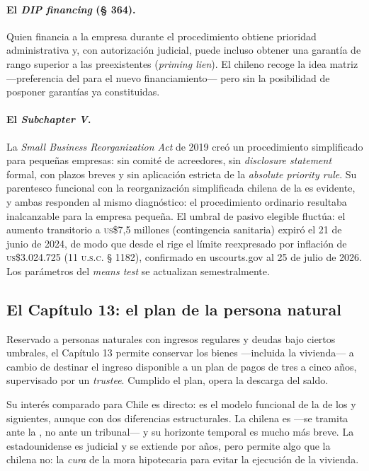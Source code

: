 \paragraph{El \emph{DIP financing} (§ 364).} Quien financia a la empresa durante el procedimiento
obtiene prioridad administrativa y, con autorización judicial, puede incluso obtener una garantía
de rango superior a las preexistentes (\emph{priming lien}). El  chileno recoge la idea
matriz ---preferencia del   para el nuevo financiamiento--- pero sin la
posibilidad de posponer garantías ya constituidas.

\paragraph{El \emph{Subchapter V}.} La \emph{Small Business Reorganization Act} de 2019 creó un
procedimiento simplificado para pequeñas empresas: sin comité de acreedores, sin
\emph{disclosure statement} formal, con plazos breves y sin aplicación estricta de la
\emph{absolute priority rule}. Su parentesco funcional con la reorganización simplificada chilena
de la \Lreforma{} es evidente, y ambas responden al mismo diagnóstico: el procedimiento ordinario
resultaba inalcanzable para la empresa pequeña. El umbral de pasivo elegible fluctúa: el aumento
transitorio a \textsc{us}\$7,5 millones (contingencia sanitaria) expiró el 21 de junio de 2024, de
modo que desde el  rige el límite reexpresado por inflación de
\textsc{us}\$3.024.725 (11 \textsc{u.s.c.} § 1182), confirmado en uscourts.gov al 25 de julio de
2026. Los parámetros del \emph{means test} se actualizan semestralmente.

\subsection{El Capítulo 13: el plan de la persona natural}

Reservado a personas naturales con ingresos regulares y deudas bajo ciertos umbrales, el Capítulo
13 permite conservar los bienes ---incluida la vivienda--- a cambio de destinar el ingreso
disponible a un plan de pagos de tres a cinco años, supervisado por un \emph{trustee}. Cumplido el
plan, opera la descarga del saldo.

Su interés comparado para Chile es directo: es el modelo funcional de la
 de los  y siguientes, aunque con dos
diferencias estructurales. La chilena es  ---se tramita ante la
\superir{}, no ante un tribunal--- y su horizonte temporal es mucho más breve. La estadounidense es
judicial y se extiende por años, pero permite algo que la chilena no: la \emph{cura} de la mora
hipotecaria para evitar la ejecución de la vivienda.

